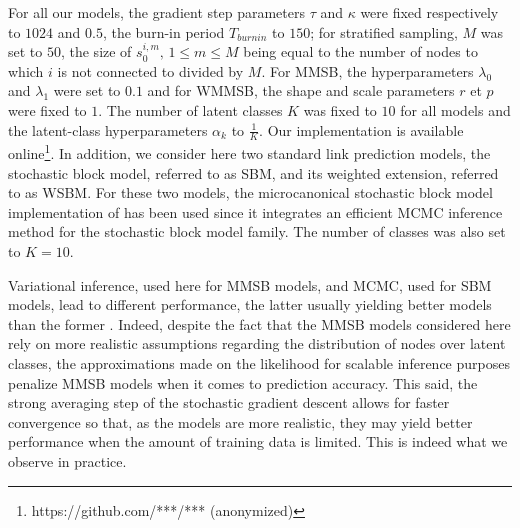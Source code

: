 For all our models, the gradient step parameters  $\tau$ and $\kappa$ were fixed respectively to  $1024$ and $0.5$, the burn-in period $T_{burnin}$ to $150$; for stratified sampling, $M$ was set to $50$, the size of $s_0^{i,m}, \, 1 \le m \le M$ being equal to the number of nodes to which $i$ is not connected to divided by $M$. For MMSB, the hyperparameters $\lambda_0$ and $\lambda_1$ were set to $0.1$ and for WMMSB, the shape and scale parameters $r$ et $p$ were fixed to $1$. The number of latent classes $K$ was fixed to $10$ for all models and the latent-class hyperparameters $\alpha_k$ to $\frac{1}{K}$. Our implementation is available online\footnote{https://github.com/***/*** (anonymized)}. In addition, we consider here two standard link prediction models, the stochastic block model, referred to as SBM, and its weighted extension, referred to as WSBM. For these two models, the microcanonical stochastic block model implementation of \cite{peixoto2018nonparametric} has been used since it integrates an efficient MCMC inference method for the stochastic block model family.  The number of classes was also set to $K=10$.

Variational inference, used here for MMSB models, and MCMC, used for SBM models, lead to different performance, the latter usually yielding better models than the former \cite{}. Indeed, despite the fact that the MMSB models considered here rely on more realistic assumptions regarding the distribution of nodes over latent classes, the approximations made on the likelihood for scalable inference purposes penalize MMSB models when it comes to prediction accuracy. This said, the strong averaging step of the stochastic gradient descent allows for faster convergence so that, as the models are more realistic, they may yield better performance when the amount of training data is limited. This is indeed what we observe in practice.


